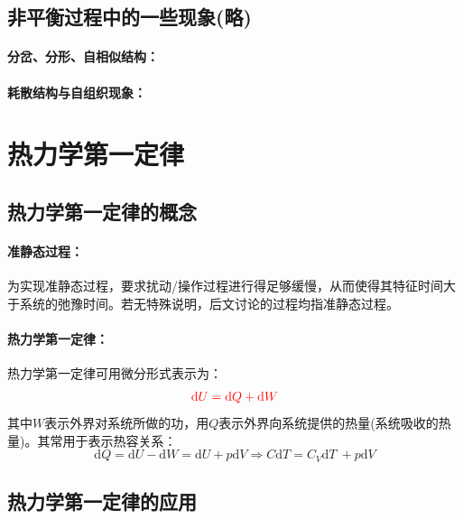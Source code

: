 \documentclass[zihao=5,UTF8]{report}
\begin{document}
\section{非平衡过程中的一些现象(略)}
\subsubsection{分岔、分形、自相似结构：}
\subsubsection{耗散结构与自组织现象：}

\chapter{热力学第一定律}
\section{热力学第一定律的概念}
\subsubsection{准静态过程：}
为实现准静态过程，要求扰动/操作过程进行得足够缓慢，从而使得其特征时间大于系统的弛豫时间。若无特殊说明，后文讨论的过程均指准静态过程。
\subsubsection{热力学第一定律：}
热力学第一定律可用微分形式表示为：
\begin{equation}
    {\color{red}\mathrm{d}U = \mathrm{d}Q +\mathrm{d}W}
\end{equation}
其中$W$表示外界对系统所做的功，用$Q$表示外界向系统提供的热量(系统吸收的热量)。其常用于表示热容关系：
\begin{equation}
    \mathrm{d}Q = \mathrm{d}U - \mathrm{d}W = \mathrm{d}U + p \mathrm{d}V \Longrightarrow C\mathrm{d}T = C_V\mathrm{d}T \ + p \mathrm{d}V
\end{equation}
\section{热力学第一定律的应用}
\end{document}
